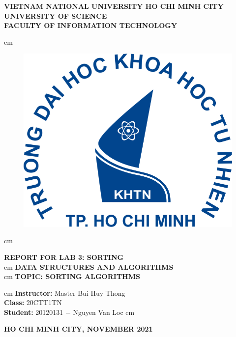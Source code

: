 \documentclass[12pt,a4paper]{article}
\author{Nguyễn Văn Lộc}
\begin{document}
\fancyhf{}
\chead{}
\cfoot{\thepage}
\rfoot{}
\lfoot{}
\pagestyle{fancy}
\renewcommand{\headrulewidth}{0pt}
\renewcommand{\footrulewidth}{0pt}
\begin{titlepage}
\begin{mybox}
\begin{center}
\fontsize{12}{12}\selectfont
\textbf{VIETNAM NATIONAL UNIVERSITY HO CHI MINH CITY}\\
\textbf{UNIVERSITY OF SCIENCE}\\
\textbf{FACULTY OF INFORMATION TECHNOLOGY}
\end{center}
 cm
\begin{figure}[H]
\begin{center}
\includegraphics[scale=0.25]{logo}
\end{center}
\end{figure}
 cm
\begin{center}
\fontsize{18}{14}\selectfont
\textbf{REPORT FOR LAB 3: SORTING}\\
 cm
\fontsize{20}{16}\selectfont
\textbf{DATA STRUCTURES AND ALGORITHMS}\\
 cm
\fontsize{18}{12}\selectfont
\textbf{TOPIC: SORTING ALGORITHMS}
\end{center}
 cm
\fontsize{14}{12}\selectfont
\textbf{Instructor:} Master Bui Huy Thong\\
\textbf{Class:} 20CTT1TN\\
\textbf{Student:} 20120131 \(-\) Nguyen Van Loc
 cm
\begin{center}
\textbf{HO CHI MINH CITY, NOVEMBER 2021}
\end{center}
\end{mybox}
\end{titlepage}
\end{document}
